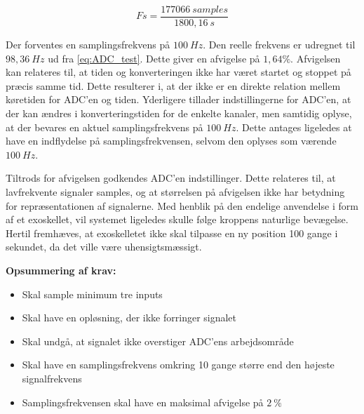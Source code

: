 \begin{equation}\label{eq:ADC_test}
Fs = \frac{177066~samples}{1800,16~s}
\end{equation}

\noindent
Der forventes en samplingsfrekvens på $100~Hz$. Den reelle frekvens er udregnet til $98,36~Hz$ ud fra \autoref{eq:ADC_test}. Dette giver en afvigelse på $1,64\%$. Afvigelsen kan relateres til, at tiden og konverteringen ikke har været startet og stoppet på præcis samme tid. Dette resulterer i, at der ikke er en direkte relation mellem køretiden for ADC'en og tiden. Yderligere tillader indstillingerne for ADC'en, at der kan ændres i konverteringstiden for de enkelte kanaler, men samtidig oplyse, at der bevares en aktuel samplingsfrekvens på $100~Hz$. Dette antages ligeledes at have en indflydelse på samplingsfrekvensen, selvom den oplyses som værende $100~Hz$. 

Tiltrods for afvigelsen godkendes ADC'en indstillinger. Dette relateres til, at lavfrekvente signaler samples, og at størrelsen på afvigelsen ikke har betydning for repræsentationen af signalerne. 
Med henblik på den endelige anvendelse i form af et exoskellet, vil systemet ligeledes skulle følge kroppens naturlige bevægelse. Hertil fremhæves, at exoskelletet ikke skal tilpasse en ny position 100 gange i sekundet, da det ville være uhensigtsmæssigt.


\vspace{3mm}
\textbf{Opsummering af krav:}
\begin{itemize}
\item[\text{\sffamily \checkmark}] Skal sample minimum tre inputs 
\item[\text{\sffamily \checkmark}] Skal have en opløsning, der ikke forringer signalet
\item[\text{\sffamily \checkmark}] Skal undgå, at signalet ikke overstiger ADC'ens arbejdsområde
\item[\text{\sffamily \checkmark}] Skal have en samplingsfrekvens omkring 10 gange større end den højeste signalfrekvens
\item[\text{\sffamily \checkmark}] Samplingsfrekvensen skal have en maksimal afvigelse på $2~\%$
\end{itemize}

